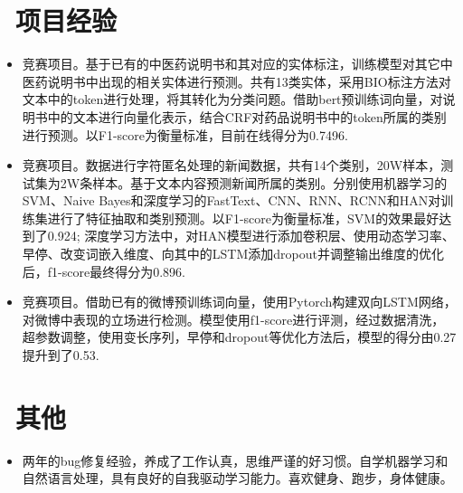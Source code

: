 \documentclass[10pt]{resume}
\begin{document}
\section{\faCogs\ 项目经验}\normalsize
\begin{itemize}
\item{竞赛项目。基于已有的中医药说明书和其对应的实体标注，训练模型对其它中医药说明书中出现的相关实体进行预测。共有13类实体，采用BIO标注方法对文本中的token进行处理，将其转化为分类问题。借助bert预训练词向量，对说明书中的文本进行向量化表示，结合CRF对药品说明书中的token所属的类别进行预测。以F1-score为衡量标准，目前在线得分为0.7496.}
\end{itemize}
\begin{itemize}
\item{竞赛项目。数据进行字符匿名处理的新闻数据，共有14个类别，20W样本，测试集为2W条样本。基于文本内容预测新闻所属的类别。分别使用机器学习的SVM、Naive Bayes和深度学习的FastText、CNN、RNN、RCNN和HAN对训练集进行了特征抽取和类别预测。以F1-score为衡量标准，SVM的效果最好达到了0.924; 深度学习方法中，对HAN模型进行添加卷积层、使用动态学习率、早停、改变词嵌入维度、向其中的LSTM添加dropout并调整输出维度的优化后，f1-score最终得分为0.896.}
\end{itemize}
 \begin{itemize}
 \item {竞赛项目。借助已有的微博预训练词向量，使用Pytorch构建双向LSTM网络，对微博中表现的立场进行检测。模型使用f1-score进行评测，经过数据清洗，超参数调整，使用变长序列，早停和dropout等优化方法后，模型的得分由0.27提升到了0.53.}
\end{itemize}
\section{\faInfo\ 其他}
\begin{itemize}\normalsize
\item {两年的bug修复经验，养成了工作认真，思维严谨的好习惯。自学机器学习和自然语言处理，具有良好的自我驱动学习能力。喜欢健身、跑步，身体健康。}
  \end{itemize}
\end{document}
